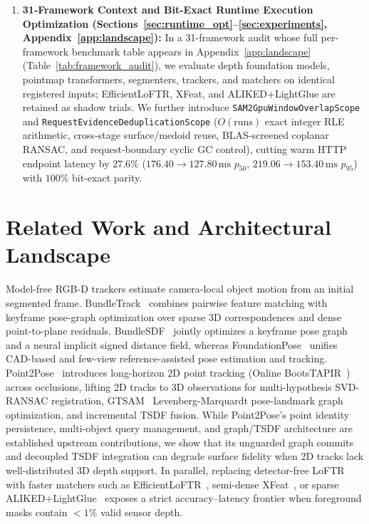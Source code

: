 \documentclass[10pt,journal]{IEEEtran}
\begin{document}
\begin{enumerate}
    \item \textbf{31-Framework Context and Bit-Exact Runtime Execution Optimization (Sections~\ref{sec:runtime_opt}--\ref{sec:experiments}, Appendix~\ref{app:landscape}):} In a 31-framework audit whose full per-framework benchmark table appears in Appendix~\ref{app:landscape} (Table~\ref{tab:framework_audit}), we evaluate depth foundation models, pointmap transformers, segmenters, trackers, and matchers on identical registered inputs; EfficientLoFTR, XFeat, and ALIKED+LightGlue are retained as shadow trials. We further introduce \texttt{SAM2GpuWindowOverlapScope} and \texttt{RequestEvidenceDeduplicationScope} ($O(\text{runs})$ exact integer RLE arithmetic, cross-stage surface/medoid reuse, BLAS-screened coplanar RANSAC, and request-boundary cyclic GC control), cutting warm HTTP endpoint latency by $27.6\%$ ($176.40\to 127.80\,\mathrm{ms}$ $p_{50}$, $219.06\to 153.40\,\mathrm{ms}$ $p_{95}$) with $100\%$ bit-exact parity.
\end{enumerate}

\section{Related Work and Architectural Landscape}
\label{sec:related}

Model-free RGB-D trackers estimate camera-local object motion from an initial segmented frame. BundleTrack~\cite{bundletrack} combines pairwise feature matching with keyframe pose-graph optimization over sparse 3D correspondences and dense point-to-plane residuals. BundleSDF~\cite{bundlesdf} jointly optimizes a keyframe pose graph and a neural implicit signed distance field, whereas FoundationPose~\cite{foundationpose} unifies CAD-based and few-view reference-assisted pose estimation and tracking. Point2Pose~\cite{point2pose} introduces long-horizon 2D point tracking (Online BootsTAPIR~\cite{bootstap}) across occlusions, lifting 2D tracks to 3D observations for multi-hypothesis SVD-RANSAC registration, GTSAM~\cite{gtsam} Levenberg-Marquardt pose-landmark graph optimization, and incremental TSDF fusion. While Point2Pose's point identity persistence, multi-object query management, and graph/TSDF architecture are established upstream contributions, we show that its unguarded graph commits and decoupled TSDF integration can degrade surface fidelity when 2D tracks lack well-distributed 3D depth support. In parallel, replacing detector-free LoFTR~\cite{loftr} with faster matchers such as EfficientLoFTR~\cite{eloftr}, semi-dense XFeat~\cite{xfeat}, or sparse ALIKED+LightGlue~\cite{aliked,lightglue} exposes a strict accuracy--latency frontier when foreground masks contain $<1\%$ valid sensor depth.
\end{document}
